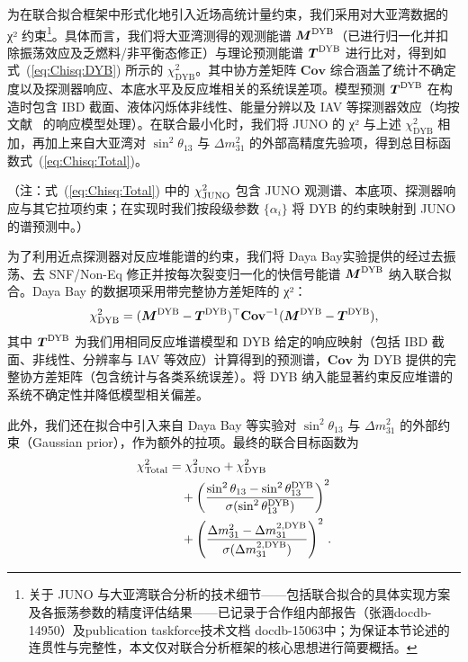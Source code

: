 为在联合拟合框架中形式化地引入近场高统计量约束，我们采用对大亚湾数据的 χ² 约束\footnote{关于 JUNO 与大亚湾联合分析的技术细节——包括联合拟合的具体实现方案及各振荡参数的精度评估结果——已记录于合作组内部报告（张涵docdb-14950）及publication taskforce技术文档 docdb-15063中；为保证本节论述的连贯性与完整性，本文仅对联合分析框架的核心思想进行简要概括。}。具体而言，我们将大亚湾测得的观测能谱 $\boldsymbol{M}^{\rm DYB}$（已进行归一化并扣除振荡效应及乏燃料/非平衡态修正）与理论预测能谱 $\boldsymbol{T}^{\rm DYB}$ 进行比对，得到如式~(\ref{eq:Chisq:DYB}) 所示的 $\chi^2_{\mathrm{DYB}}$。其中协方差矩阵 $\mathbf{Cov}$ 综合涵盖了统计不确定度以及探测器响应、本底水平及反应堆相关的系统误差项。模型预测 $\boldsymbol{T}^{\rm DYB}$ 在构造时包含 IBD 截面、液体闪烁体非线性、能量分辨以及 IAV 等探测器效应（均按文献~\cite{PhysRevLett.134.201802} 的响应模型处理）。在联合最小化时，我们将 JUNO 的 χ² 与上述 $\chi^2_{\mathrm{DYB}}$ 相加，再加上来自大亚湾对 $\sin^2\theta_{13}$ 与 $\Delta m^2_{31}$ 的外部高精度先验项，得到总目标函数式~(\ref{eq:Chisq:Total})。

（注：式~(\ref{eq:Chisq:Total}) 中的 $\chi^2_{\rm JUNO}$ 包含 JUNO 观测谱、本底项、探测器响应与其它拉项约束；在实现时我们按段级参数 $\{\alpha_i\}$ 将 DYB 的约束映射到 JUNO 的谱预测中。）

为了利用近点探测器对反应堆能谱的约束，我们将 Daya Bay实验\cite{PhysRevLett.134.201802}提供的经过去振荡、去 SNF/Non-Eq 修正并按每次裂变归一化的快信号能谱 $\boldsymbol{M}^{\rm DYB}$ 纳入联合拟合。Daya Bay 的数据项采用带完整协方差矩阵的 χ²：  
\begin{equation}  
\chi^2_{\rm DYB} = (\boldsymbol{M}^{\rm DYB} - \boldsymbol{T}^{\rm DYB})^\top \mathbf{Cov}^{-1} (\boldsymbol{M}^{\rm DYB} - \boldsymbol{T}^{\rm DYB}),  
\label{eq:Chisq:DYB}  
\end{equation}  
其中 $\boldsymbol{T}^{\rm DYB}$ 为我们用相同反应堆谱模型和 DYB 给定的响应映射（包括 IBD 截面、非线性、分辨率与 IAV 等效应）计算得到的预测谱，$\mathbf{Cov}$ 为 DYB 提供的完整协方差矩阵（包含统计与各类系统误差）。将 DYB 纳入能显著约束反应堆谱的系统不确定性并降低模型相关偏差。

此外，我们还在拟合中引入来自 Daya Bay 等实验对 $\sin^2\theta_{13}$ 与 $\Delta m^2_{31}$ 的外部约束（Gaussian prior），作为额外的拉项。最终的联合目标函数为  
\begin{equation}
\begin{aligned}
\chi^2_{\rm Total}
&= \chi^2_{\rm JUNO} + \chi^2_{\rm DYB} \\
&\quad + \left( \frac{\sin^2\theta_{13} - \sin^2\theta_{13}^{\rm DYB}}{\sigma(\sin^2\theta_{13}^{\rm DYB})} \right)^2 \\
&\quad + \left( \frac{\Delta m_{31}^2 - \Delta m_{31}^{2,\rm DYB}}{\sigma(\Delta m_{31}^{2,\rm DYB})} \right)^2 \, .
\end{aligned}
\label{eq:Chisq:Total}
\end{equation}


